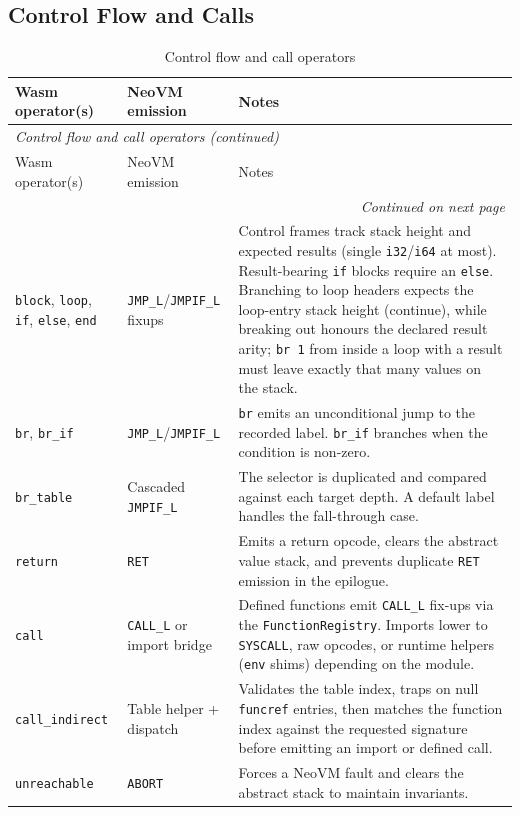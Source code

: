 \documentclass[11pt]{article}
\begin{document}
\subsection{Control Flow and Calls}
\begin{longtable}{@{}p{4.7cm}p{3.8cm}p{6.5cm}@{}}
\caption{Control flow and call operators}\\
\toprule
Wasm operator(s) & NeoVM emission & Notes \\
\midrule
\endfirsthead
\multicolumn{3}{l}{\textit{Control flow and call operators (continued)}}\\
\toprule
Wasm operator(s) & NeoVM emission & Notes \\
\midrule
\endhead
\midrule
\multicolumn{3}{r}{\textit{Continued on next page}}\\
\bottomrule
\endfoot
\bottomrule
\endlastfoot
\texttt{block}, \texttt{loop}, \texttt{if}, \texttt{else}, \texttt{end} & \texttt{JMP\_L}/\texttt{JMPIF\_L} fixups & Control frames track stack height and expected results (single \texttt{i32}/\texttt{i64} at most). Result-bearing \texttt{if} blocks require an \texttt{else}. Branching to loop headers expects the loop-entry stack height (continue), while breaking out honours the declared result arity; \texttt{br 1} from inside a loop with a result must leave exactly that many values on the stack.
\tabularnewline
\texttt{br}, \texttt{br\_if} & \texttt{JMP\_L}/\texttt{JMPIF\_L} & \texttt{br} emits an unconditional jump to the recorded label. \texttt{br\_if} branches when the condition is non-zero.
\tabularnewline
\texttt{br\_table} & Cascaded \texttt{JMPIF\_L} & The selector is duplicated and compared against each target depth. A default label handles the fall-through case.
\tabularnewline
\texttt{return} & \texttt{RET} & Emits a return opcode, clears the abstract value stack, and prevents duplicate \texttt{RET} emission in the epilogue.
\tabularnewline
\texttt{call} & \texttt{CALL\_L} or import bridge & Defined functions emit \texttt{CALL\_L} fix-ups via the \texttt{FunctionRegistry}. Imports lower to \texttt{SYSCALL}, raw opcodes, or runtime helpers (\texttt{env} shims) depending on the module.
\tabularnewline
\texttt{call\_indirect} & Table helper + dispatch & Validates the table index, traps on null \texttt{funcref} entries, then matches the function index against the requested signature before emitting an import or defined call.
\tabularnewline
\texttt{unreachable} & \texttt{ABORT} & Forces a NeoVM fault and clears the abstract stack to maintain invariants.
\tabularnewline
\end{longtable}
\end{document}
